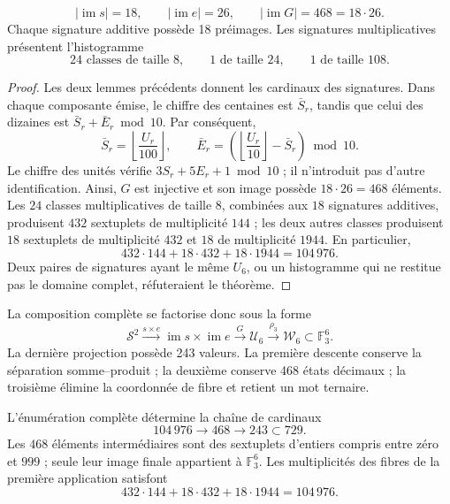\begin{theorem}
\label{pf84:E02-20}
\[
|\operatorname{im}s|=18,\qquad
|\operatorname{im}e|=26,\qquad
|\operatorname{im}G|=468=18\cdot26.
\]
Chaque signature additive possède 18 préimages. Les signatures multiplicatives présentent
l'histogramme
\[
24\text{ classes de taille }8,\qquad
1\text{ de taille }24,\qquad
1\text{ de taille }108.
\]
\end{theorem}
\begin{proof}
Les deux lemmes précédents donnent les cardinaux des signatures. Dans chaque composante
émise, le chiffre des centaines est \(\bar S_r\), tandis que celui des dizaines est
\(\bar S_r+\bar E_r\bmod10\). Par conséquent,
\[
 \bar S_r=\left\lfloor\frac{U_r}{100}\right\rfloor,\qquad
 \bar E_r=
 \left(\left\lfloor\frac{U_r}{10}\right\rfloor-\bar S_r\right)\bmod10.
\]
Le chiffre des unités vérifie \(3S_r+5E_r+1\bmod10\) ; il n'introduit pas d'autre
identification. Ainsi, \(G\) est injective et son image possède
\(18\cdot26=468\) éléments. Les \(24\) classes multiplicatives de taille
\(8\), combinées aux \(18\) signatures additives, produisent \(432\) sextuplets
de multiplicité \(144\) ; les deux autres classes produisent \(18\) sextuplets de
multiplicité \(432\) et \(18\) de multiplicité \(1944\). En particulier,
\[
 432\cdot144+18\cdot432+18\cdot1944=104\,976.
\]
Deux paires de signatures ayant le même \(U_6\), ou un histogramme qui ne restitue pas le
domaine complet, réfuteraient le théorème.
\end{proof}

La composition complète se factorise donc sous la forme
\[
\mathcal S^2\xrightarrow{s\times e}
\operatorname{im}s\times\operatorname{im}e
\xrightarrow{G}\mathcal U_6
\xrightarrow{\rho_3}\mathcal W_6\subset\mathbb F_3^6.
\]
La dernière projection possède 243 valeurs. La première descente conserve la
séparation somme--produit ; la deuxième conserve 468 états décimaux ; la
troisième élimine la coordonnée de fibre et retient un mot ternaire.

\begin{corollary}
\label{cor:censo-proyeccion-observable}
\label{pf84:E02-21}
L'énumération complète détermine la chaîne de cardinaux
\[
 104\,976\longrightarrow468\longrightarrow243\subset729.
\]
Les \(468\) éléments intermédiaires sont des sextuplets d'entiers compris entre
zéro et \(999\) ; seule leur image finale appartient à \(\mathbb F_3^6\). Les
multiplicités des fibres de la première application satisfont
\[
 432\cdot144+18\cdot432+18\cdot1944=104\,976.
\]
\end{corollary}

